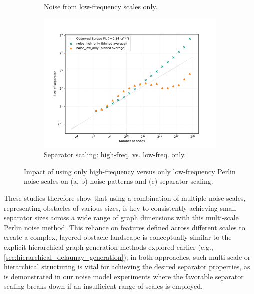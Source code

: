 \begin{figure}[tbhp]
\begin{subfigure}{0.25\linewidth}
		\caption{Noise from low-frequency scales only.}
		\label{fig:noise_low_freq_viz}
	\end{subfigure}
	\hfill
    \begin{subfigure}{0.45\linewidth}
		\centering
		\includegraphics[width=\linewidth]{graphics/noise_high_vs_low_only.pdf}
		\caption{Separator scaling: high-freq. vs. low-freq. only.}
		\label{fig:noise_ablation_sep_plot}
	\end{subfigure}
	\caption{Impact of using only high-frequency versus only low-frequency Perlin noise scales on (a, b) noise patterns and (c) separator scaling.}
	\label{fig:noise_layer_ablation}
\end{figure}

These studies therefore show that using a combination of multiple noise scales, representing obstacles of various sizes, is key to consistently achieving small separator sizes across a wide range of graph dimensions with this multi-scale Perlin noise method.
This reliance on features defined across different scales to create a complex, layered obstacle landscape is conceptually similar to the explicit hierarchical graph generation methods explored earlier (e.g., \cref{sec:hierarchical_delaunay_generation}); in both approaches, such multi-scale or hierarchical structuring is vital for achieving the desired separator properties, as is demonstrated in our noise model experiments where the favorable separator scaling breaks down if an insufficient range of scales is employed.
